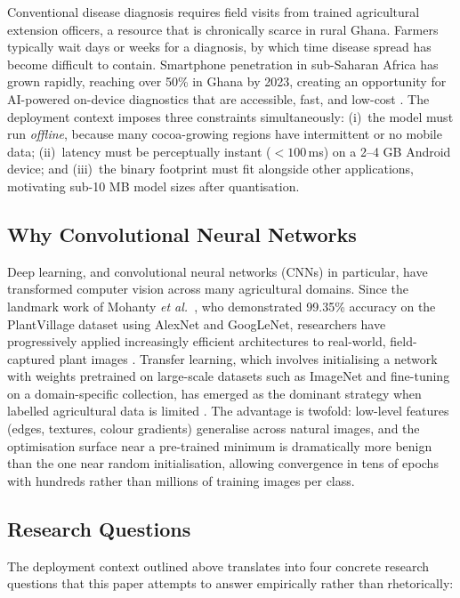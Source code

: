 \documentclass[conference,10pt]{IEEEtran}
\begin{document}
Conventional disease diagnosis requires field visits from trained agricultural
extension officers, a resource that is chronically scarce in rural Ghana.
Farmers typically wait days or weeks for a diagnosis, by which time disease
spread has become difficult to contain. Smartphone penetration in sub-Saharan
Africa has grown rapidly, reaching over 50\% in Ghana by 2023, creating an
opportunity for AI-powered on-device diagnostics that are accessible, fast,
and low-cost \cite{cocoacompanion2022}. The deployment context imposes three
constraints simultaneously: (i)~the model must run \emph{offline}, because
many cocoa-growing regions have intermittent or no mobile data; (ii)~latency
must be perceptually instant ($<\!100$\,ms) on a 2--4 GB Android device; and
(iii)~the binary footprint must fit alongside other applications, motivating
sub-10 MB model sizes after quantisation.

\subsection{Why Convolutional Neural Networks}

Deep learning, and convolutional neural networks (CNNs) in particular, have
transformed computer vision across many agricultural domains. Since the
landmark work of Mohanty \emph{et al.}~\cite{mohanty2016}, who demonstrated
99.35\% accuracy on the PlantVillage dataset using AlexNet and GoogLeNet,
researchers have progressively applied increasingly efficient architectures to
real-world, field-captured plant images \cite{alvarado2025}. Transfer
learning, which involves initialising a network with weights pretrained on
large-scale datasets such as ImageNet and fine-tuning on a domain-specific
collection, has emerged as the dominant strategy when labelled agricultural
data is limited \cite{transfer2024}. The advantage is twofold: low-level
features (edges, textures, colour gradients) generalise across natural images,
and the optimisation surface near a pre-trained minimum is dramatically more
benign than the one near random initialisation, allowing convergence in tens
of epochs with hundreds rather than millions of training images per class.

\subsection{Research Questions}\label{ssec:rq}

The deployment context outlined above translates into four concrete research
questions that this paper attempts to answer empirically rather than
rhetorically:
\end{document}
